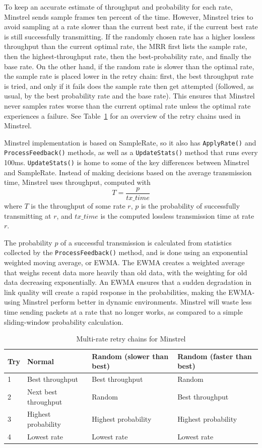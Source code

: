\documentclass[twocolumn,10pt]{article}
\begin{document}
To keep an accurate estimate of throughput and probability for each
rate, Minstrel sends sample frames ten percent of the time.  However,
Minstrel tries to avoid sampling at a rate slower than the current
best rate, if the current best rate is still successfully
transmitting.  If the randomly chosen rate has a higher lossless
throughput than the current optimal rate, the MRR first lists the
sample rate, then the highest-throughput rate, then the
best-probability rate, and finally the base rate.  On the other hand,
if the random rate is slower than the optimal rate, the sample rate is
placed lower in the retry chain: first, the best throughput rate is
tried, and only if it fails does the sample rate then get attempted
(followed, as usual, by the best probability rate and the base rate).
This ensures that Minstrel never samples rates worse than the current
optimal rate unless the optimal rate experiences a failure.  See
Table~\ref{table:mrr} for an overview of the retry chains used in
Minstrel.

Minstrel implementation is based on SampleRate, so it also has
\texttt{ApplyRate()} and \texttt{ProcessFeedback()} methods, as well
as a \texttt{UpdateStats()} method that runs every 100ms.
\texttt{UpdateStats()} is home to some of the key differences between
Minstrel and SampleRate.  Instead of making decisions based on the
average transmission time, Minstrel uses throughput, computed with $$T
= \frac{p}{tx\_time}$$ where $T$ is the throughput of some rate $r$,
$p$ is the probability of successfully transmitting at $r$, and
$tx\_time$ is the computed lossless transmission time at rate $r$.

The probability $p$ of a successful transmission is calculated from
statistics collected by the \texttt{ProcessFeedback()} method, and is
done using an exponential weighted moving average, or EWMA.  The EWMA
creates a weighted average that weighs recent data more heavily than
old data, with the weighting for old data decreasing exponentially.
An EWMA ensures that a sudden degradation in link quality will create
a rapid response in the probabilities, making the EWMA-using Minstrel
perform better in dynamic environments.  Minstrel will waste less time
sending packets at a rate that no longer works, as compared to a
simple sliding-window probability calculation.

\begin{table}[htb]
  \centering
    \begin{tabular}[htb]{l|l|l|l}
    \textbf{Try} & \textbf{Normal} &
    \textbf{Random (slower than best)} &
    \textbf{Random (faster than best)} \\ \hline
    1 & Best throughput      & Best throughput     & Random              \\
    2 & Next best throughput & Random              & Best throughput     \\
    3 & Highest probability  & Highest probability & Highest probability \\
    4 & Lowest rate          & Lowest rate         & Lowest rate         \\
    \end{tabular}
    \caption{Multi-rate retry chains for Minstrel}
\label{table:mrr}
\end{table}
\end{document}
